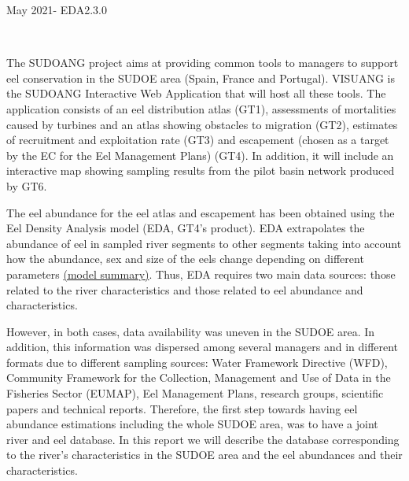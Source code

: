 \documentclass[pdftex,12pt,a4paper,svgnames]{report}\usepackage[]{graphicx}\usepackage[]{color}
\begin{document}
\begin{titlepage}
\begin{center}
\color{orangesudolight}\LARGE{{May 2021- EDA2.3.0}}
\end{center}
\vspace*{1cm}
\restoregeometry
\end{titlepage}
\pagebreak
\restoregeometry
\pagecolor{white}
\tableofcontents
\pagebreak



  







\renewcommand{\arraystretch}{1.5} %
\begin{center}
\Huge\textsc{}\\
\end{center}
\vspace*{5cm}

The SUDOANG project aims at providing common tools to managers to support eel
conservation in the SUDOE area (Spain, France and Portugal). VISUANG is the
SUDOANG Interactive Web Application that will host all these tools. The
application consists of an eel distribution atlas (GT1), assessments of
mortalities caused by turbines and an atlas showing obstacles to migration
(GT2), estimates of recruitment and exploitation rate (GT3) and
escapement (chosen as a target by the EC for the Eel Management Plans) (GT4).
In addition, it will include an interactive map showing sampling results from
the pilot basin network produced by GT6.

The eel abundance for the eel atlas and escapement has been obtained using
the Eel Density Analysis model (EDA, GT4's product). EDA extrapolates the
abundance of eel in sampled river segments to other segments taking into
account how the abundance, sex and size of the eels change depending on
different parameters
\href{https://www.youtube.com/watch?v=uS5sehcH7Uc&ab_channel=SUDOANG}{(model
summary)}. Thus, EDA requires two main data sources: those related to the river
characteristics and those related to eel abundance and characteristics.

However, in both cases, data availability was uneven in the SUDOE area. In
addition, this information was dispersed among several managers and in
different formats due to different sampling sources: Water Framework Directive
(WFD), Community Framework for the Collection, Management and Use of Data in
the Fisheries Sector (EUMAP), Eel Management Plans, research groups, scientific
papers and technical reports. Therefore, the first step towards having eel
abundance estimations including the whole SUDOE area, was to have a joint river
and eel database. In this report we will describe the database corresponding
to the river’s characteristics in the SUDOE area and the eel abundances and
their characteristics.
\end{document}
